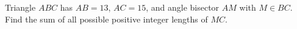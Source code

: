 Triangle $ABC$ has $AB=13$, $AC=15$, and angle bisector $AM$ with $M\in BC$. Find the sum of all possible positive integer lengths of $MC$.
